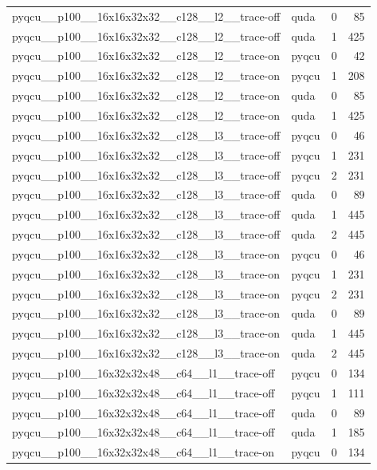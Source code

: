 \begin{table}[htbp]
\begin{tabular}{@{}llrr@{}}
pyqcu\_\_p100\_\_16x16x32x32\_\_c128\_\_l2\_\_trace-off & quda & 0 & 85 \\
pyqcu\_\_p100\_\_16x16x32x32\_\_c128\_\_l2\_\_trace-off & quda & 1 & 425 \\
pyqcu\_\_p100\_\_16x16x32x32\_\_c128\_\_l2\_\_trace-on & pyqcu & 0 & 42 \\
pyqcu\_\_p100\_\_16x16x32x32\_\_c128\_\_l2\_\_trace-on & pyqcu & 1 & 208 \\
pyqcu\_\_p100\_\_16x16x32x32\_\_c128\_\_l2\_\_trace-on & quda & 0 & 85 \\
pyqcu\_\_p100\_\_16x16x32x32\_\_c128\_\_l2\_\_trace-on & quda & 1 & 425 \\
pyqcu\_\_p100\_\_16x16x32x32\_\_c128\_\_l3\_\_trace-off & pyqcu & 0 & 46 \\
pyqcu\_\_p100\_\_16x16x32x32\_\_c128\_\_l3\_\_trace-off & pyqcu & 1 & 231 \\
pyqcu\_\_p100\_\_16x16x32x32\_\_c128\_\_l3\_\_trace-off & pyqcu & 2 & 231 \\
pyqcu\_\_p100\_\_16x16x32x32\_\_c128\_\_l3\_\_trace-off & quda & 0 & 89 \\
pyqcu\_\_p100\_\_16x16x32x32\_\_c128\_\_l3\_\_trace-off & quda & 1 & 445 \\
pyqcu\_\_p100\_\_16x16x32x32\_\_c128\_\_l3\_\_trace-off & quda & 2 & 445 \\
pyqcu\_\_p100\_\_16x16x32x32\_\_c128\_\_l3\_\_trace-on & pyqcu & 0 & 46 \\
pyqcu\_\_p100\_\_16x16x32x32\_\_c128\_\_l3\_\_trace-on & pyqcu & 1 & 231 \\
pyqcu\_\_p100\_\_16x16x32x32\_\_c128\_\_l3\_\_trace-on & pyqcu & 2 & 231 \\
pyqcu\_\_p100\_\_16x16x32x32\_\_c128\_\_l3\_\_trace-on & quda & 0 & 89 \\
pyqcu\_\_p100\_\_16x16x32x32\_\_c128\_\_l3\_\_trace-on & quda & 1 & 445 \\
pyqcu\_\_p100\_\_16x16x32x32\_\_c128\_\_l3\_\_trace-on & quda & 2 & 445 \\
pyqcu\_\_p100\_\_16x32x32x48\_\_c64\_\_l1\_\_trace-off & pyqcu & 0 & 134 \\
pyqcu\_\_p100\_\_16x32x32x48\_\_c64\_\_l1\_\_trace-off & pyqcu & 1 & 111 \\
pyqcu\_\_p100\_\_16x32x32x48\_\_c64\_\_l1\_\_trace-off & quda & 0 & 89 \\
pyqcu\_\_p100\_\_16x32x32x48\_\_c64\_\_l1\_\_trace-off & quda & 1 & 185 \\
pyqcu\_\_p100\_\_16x32x32x48\_\_c64\_\_l1\_\_trace-on & pyqcu & 0 & 134 \\

\end{tabular}
\end{table}
